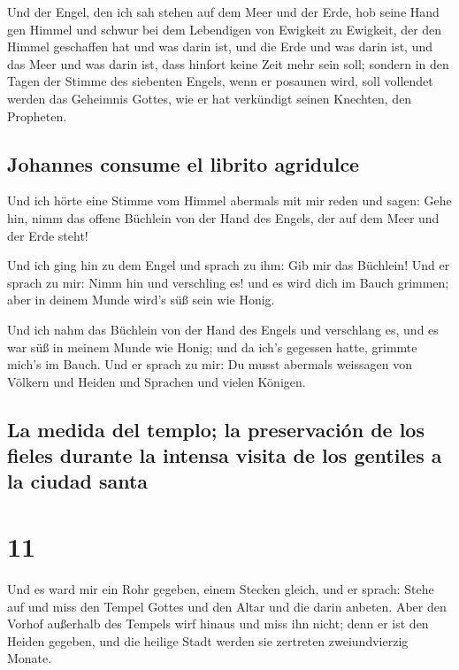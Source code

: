  Und der Engel, den ich sah stehen auf dem Meer und der
Erde, hob seine Hand gen Himmel  und schwur bei dem
Lebendigen von Ewigkeit zu Ewigkeit, der den Himmel geschaffen hat und
was darin ist, und die Erde und was darin ist, und das Meer und was
darin ist, dass hinfort keine Zeit mehr sein soll; 
sondern in den Tagen der Stimme des siebenten Engels, wenn er posaunen
wird, soll vollendet werden das Geheimnis Gottes, wie er hat verkündigt
seinen Knechten, den Propheten.

\hypertarget{johannes-consume-el-librito-agridulce}{%
\subsection{Johannes consume el librito
agridulce}\label{johannes-consume-el-librito-agridulce}}

 Und ich hörte eine Stimme vom Himmel abermals mit mir
reden und sagen: Gehe hin, nimm das offene Büchlein von der Hand des
Engels, der auf dem Meer und der Erde steht!

 Und ich ging hin zu dem Engel und sprach zu ihm: Gib mir
das Büchlein! Und er sprach zu mir: Nimm hin und verschling es! und es
wird dich im Bauch grimmen; aber in deinem Munde wird's süß sein wie
Honig.

 Und ich nahm das Büchlein von der Hand des Engels und
verschlang es, und es war süß in meinem Munde wie Honig; und da ich's
gegessen hatte, grimmte mich's im Bauch.  Und er sprach
zu mir: Du musst abermals weissagen von Völkern und Heiden und Sprachen
und vielen Königen.

\hypertarget{la-medida-del-templo-la-preservaciuxf3n-de-los-fieles-durante-la-intensa-visita-de-los-gentiles-a-la-ciudad-santa}{%
\subsection{La medida del templo; la preservación de los fieles durante
la intensa visita de los gentiles a la ciudad
santa}\label{la-medida-del-templo-la-preservaciuxf3n-de-los-fieles-durante-la-intensa-visita-de-los-gentiles-a-la-ciudad-santa}}

\hypertarget{section-10}{%
\section{11}\label{section-10}}

 Und es ward mir ein Rohr gegeben, einem Stecken gleich,
und er sprach: Stehe auf und miss den Tempel Gottes und den Altar und
die darin anbeten.  Aber den Vorhof außerhalb des Tempels
wirf hinaus und miss ihn nicht; denn er ist den Heiden gegeben, und die
heilige Stadt werden sie zertreten zweiundvierzig Monate.

